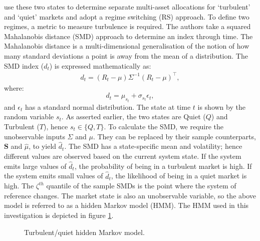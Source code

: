 \documentclass[a4paper,11pt,nocenter,bold,noupper,headcount]{mythesis}
\theoremstyle{plain}
\theoremstyle{definition}
\begin{document}
\cite{K12} use these two states to determine separate multi-asset allocations for `turbulent' and `quiet' markets and adopt a regime switching (RS) approach. To define two regimes, a metric to measure turbulence is required. The authors take a squared Mahalanobis distance (SMD) approach to determine an index through time. The Mahalanobis distance is a multi-dimensional generalisation of the notion of how many standard deviations a point is away from the mean of a distribution. The SMD index ($d_t$) is expressed mathematically as:
\begin{align}
d_t = (R_t - \mu)\Sigma^{-1}(R_t - \mu)^\intercal,
\end{align}
where: $$d_t = \mu_{s_t} + \sigma_{s_t}\epsilon_t,$$ and $\epsilon_t$ has a standard normal distribution. The state at time $t$ is shown by the random variable $s_t$. As asserted earlier, the two states are Quiet ($Q$) and Turbulent ($T$), hence $s_t \in \{Q, T\}$. To calculate the SMD, we require the unobservable inputs $\Sigma$ and $\mu$. They can be replaced by their sample counterparts, $\textbf{S}$ and $\hat{\mu}$, to yield $\hat{d}_t$. The SMD has a state-specific mean and volatility; hence different values are observed based on the current system state. If the system emits large values of $\hat{d}_t$, the probability of being in a turbulent market is high. If the system emits small values of $\hat{d}_t$, the likelihood of being in a quiet market is high. The $\zeta^{th}$ quantile of the sample SMDs is the point where the system of reference changes. The market state is also an unobservable variable, so the above model is referred to as a hidden Markov model (HMM). The HMM used in this investigation is depicted in figure \ref{hmm}.

\begin{figure} [h] 
\centering
{}
\caption{Turbulent/quiet hidden Markov model.} 
\label{hmm}
\end{figure}
\end{document}
